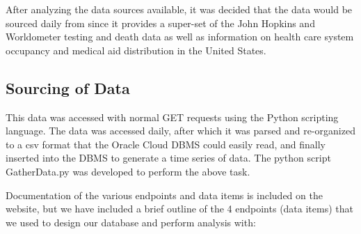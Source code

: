 \documentclass[11pt]{article}
\newcommand{\MYhref}[3][blue]{\href{#2}{\color{#1}{#3}}}%
\begin{document}
\noindent
After analyzing the data sources available, it was decided that the data would be sourced daily from \MYhref{https://www.npmjs.com/package/covid19-api}{Covid-19 API} since it provides a super-set of the John Hopkins and Worldometer testing and death data as well as information on health care system occupancy and medical aid distribution in the United States. 

\subsection{Sourcing of Data}
\label{subsec:sourcedata}


\noindent
This data was accessed with normal GET requests using the Python scripting language. The data was accessed daily, after which it was parsed and re-organized to a csv format that the Oracle Cloud DBMS could easily read, and finally inserted into the DBMS to generate a time series of data. The python script GatherData.py was developed to perform the above task.


\noindent 
Documentation of the various endpoints and data items is included on the \MYhref{https://covid19-docs.chrismichael.now.sh/}{Covid-19 API} website, but we have included a brief outline of the 4 endpoints (data items) that we used to design our database and perform analysis with:
\end{document}
